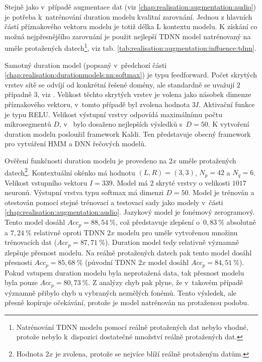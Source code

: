 Stejně jako v~případě augmentace dat (viz \ref{chap:realisation:augmentation:audio}) je potřeba  k~natrénování duration modelu kvalitní zarovnání. Jednou z hlavních částí příznakového vektoru modelu je totiž délka L kontextu modelu. K získání co možná nejpřesnějšího zarovnání je použit nejlepší TDNN model natrénovaný na uměle protažených datech\footnote{Natrénování TDNN modelu pomocí reálně protažených dat nebylo vhodné, protože nebylo  k~dispozici dostatečné množství reálně protažených dat.}, viz tab. \ref{tab:realisation:augmentation:influence:tdnn}.

Samotný duration model (popsaný v~předchozí části \ref{chap:realisation:durationmodels:nn:softmax}) je typu feedforward.  Počet skrytých vrstev sítě se odvíjí od konkrétní řešené domény, ale standardně se uvažují $2$ případně $3$, viz \cite{Hadian2017}. Velikost těchto skrytých vrstev je volena jako násobek dimenze příznakového vektoru, v~tomto případě byl zvolena hodnota $3I$. Aktivační funkce je typu RELU. Velikost výstupní vrstvy odpovídá maximálnímu počtu mikrosegmentů $D$, v~\cite{Hadian2017} bylo dosaženo nejlepších výsledků s~$D=50$. K vytvoření duration modelu posloužil framework Kaldi. Ten představuje obecný framework pro vytváření HMM a DNN řečových modelů.

Ověření funkčnosti duration modelu je provedeno na $2x$ uměle protažených datech\footnote{Hodnota $2x$ je zvolena, protože se nejvíce blíží reálně protaženým datům.}. Kontextuální okénko má hodnotu $\left(L, R\right) = \left(3, 3\right)$, $N_{p} = 42$ a $N_{q} = 6$. Velikost vstupního vektoru $I = 339$. Model má $2$ skryté vrstvy o velikosti $1017$ neuronů. Výstupní vrstva typu softmax má dimenzi $D=50$. Model je trénován a otestován pomocí stejné trénovací a testovací sady jako modely v~části \ref{chap:realisation:augmentation:audio}. Jazykový model je fonémový zerogramový. Tento model dosáhl $Acc_{p} = 88,54~\%$, což představuje zlepšení o~$0,83~\%$ absolutně a $7,24~\%$ relativně oproti TDNN $2x$ modelu pro uměle vytvořenou množinu trénovacích dat ($Acc_{p} = 87,71~\%$). Duration model tedy relativně významně zlepšuje přesnost modelu. Na reálně protažených datech pak tento model dosáhl přesnosti $Acc_{p} = 85,68~\%$ (původní TDNN $2x$ model dosáhl $Acc_{p} = 84,51~\%$). Pokud vstupem duration modelu byla neprotažená data, tak přesnost modelu byla pouze $Acc_{p} = 80,73~\%$. Z analýzy chyb pak plyne, že v~takovém případě významně přibylo chyb u vybraných neznělých fonémů. Tento výsledek, ale přesně kopíruje očekávání, protože je model natrénován na protaženou podobu.

